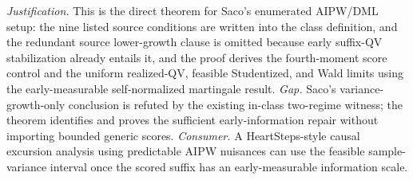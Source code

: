 \documentclass{article}
\begin{document}
\par\smallskip\noindent \textit{Justification.} This is the direct theorem for Saco's enumerated AIPW/DML setup: the nine listed source conditions are written into the class definition, and the redundant source lower-growth clause is omitted because early suffix-QV stabilization already entails it, and the proof derives the fourth-moment score control and the uniform realized-QV, feasible Studentized, and Wald limits using the early-measurable self-normalized martingale result. \textit{Gap.} Saco's variance-growth-only conclusion is refuted by the existing in-class two-regime witness; the theorem identifies and proves the sufficient early-information repair without importing bounded generic scores. \textit{Consumer.} A HeartSteps-style causal excursion analysis using predictable AIPW nuisances can use the feasible sample-variance interval once the scored suffix has an early-measurable information scale.
\end{document}
